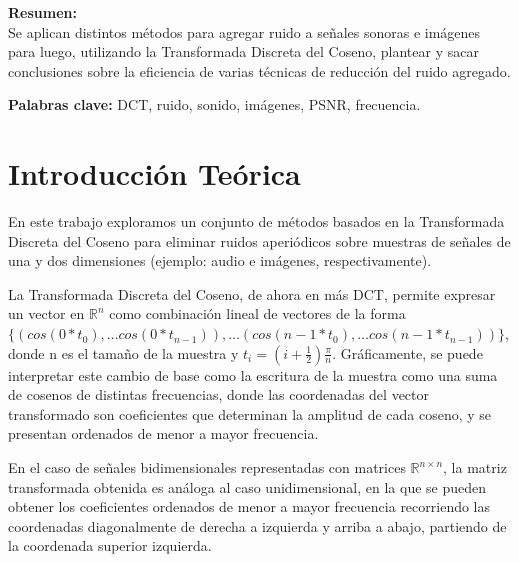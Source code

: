 \documentclass[a4paper,10pt,twoside]{article}
\begin{document}
\textbf{Resumen:} \\
Se aplican distintos métodos para agregar ruido a señales sonoras e imágenes para luego, utilizando la Transformada Discreta del Coseno, plantear y sacar conclusiones sobre la eficiencia de varias técnicas de reducción del ruido agregado.

\textbf{Palabras clave:}
DCT, ruido, sonido, imágenes, PSNR, frecuencia.

\newpage




\tableofcontents

\newpage




\section{Introducción Teórica}

En este trabajo exploramos un conjunto de métodos basados en la Transformada Discreta del Coseno para eliminar ruidos aperiódicos sobre muestras de señales de una y dos dimensiones (ejemplo: audio e imágenes, respectivamente).

La Transformada Discreta del Coseno, de ahora en más DCT, permite expresar un vector en $\mathbb{R}^n$ como combinación lineal de vectores de la forma $\{(cos(0 * t_0), \ldots cos(0 * t_{n-1})), \ldots (cos(n-1 * t_0), \ldots cos(n-1 * t_{n-1})) \}$, donde n es el tamaño de la muestra y $t_i = (i + \frac{1}{2})\frac{\pi}{n}$. Gráficamente, se puede interpretar este cambio de base como la escritura de la muestra como una suma de cosenos de distintas frecuencias, donde las coordenadas del vector transformado son coeficientes que determinan la amplitud de cada coseno, y se presentan ordenados de menor a mayor frecuencia.

En el caso de señales bidimensionales representadas con matrices $\mathbb{R}^{n \times n}$, la matriz transformada obtenida es análoga al caso unidimensional, en la que se pueden obtener los coeficientes ordenados de menor a mayor frecuencia recorriendo las coordenadas diagonalmente de derecha a izquierda y arriba a abajo, partiendo de la coordenada superior izquierda.
\end{document}
